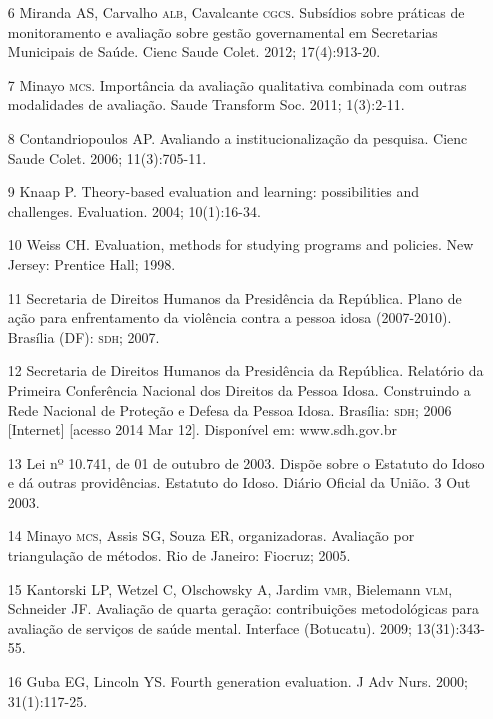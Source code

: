 \documentclass{article}
\begin{document}
\begin{itemize}
\item[6] Miranda AS, Carvalho \textsc{alb}, Cavalcante \textsc{cgcs}. Subsídios sobre práticas de
monitoramento e avaliação sobre gestão governamental em Secretarias Municipais
de Saúde. Cienc Saude Colet. 2012; 17(4):913-20.

\item[7] Minayo \textsc{mcs}. Importância da avaliação qualitativa combinada com outras
modalidades de avaliação. Saude Transform Soc. 2011; 1(3):2-11.

\item[8] Contandriopoulos AP. Avaliando a institucionalização da pesquisa. Cienc
Saude Colet. 2006; 11(3):705-11.

\item[9] Knaap P. Theory-based evaluation and learning: possibilities and
challenges. Evaluation. 2004; 10(1):16-34.

\item[10] Weiss CH. Evaluation, methods for studying programs and policies. New
Jersey: Prentice Hall; 1998.

\item[11] Secretaria de Direitos Humanos da Presidência da República. Plano de
ação para enfrentamento da violência contra a pessoa idosa (2007-2010). Brasília
(DF): \textsc{sdh}; 2007.

\item[12] Secretaria de Direitos Humanos da Presidência da República. Relatório
da Primeira Conferência Nacional dos Direitos da Pessoa Idosa. Construindo a
Rede Nacional de Proteção e Defesa da Pessoa Idosa. Brasília: \textsc{sdh}; 2006
[Internet] [acesso 2014 Mar 12]. Disponível em: www.sdh.gov.br

\item[13] Lei nº 10.741, de 01 de outubro de 2003. Dispõe sobre o Estatuto do
Idoso e dá outras providências. Estatuto do Idoso. Diário Oficial da União. 3
Out 2003.

\item[14] Minayo \textsc{mcs}, Assis SG, Souza ER, organizadoras. Avaliação por
triangulação de métodos. Rio de Janeiro: Fiocruz; 2005.

\item[15] Kantorski LP, Wetzel C, Olschowsky A, Jardim \textsc{vmr}, Bielemann \textsc{vlm},
Schneider JF. Avaliação de quarta geração: contribuições metodológicas para
avaliação de serviços de saúde mental. Interface (Botucatu). 2009;
13(31):343-55.

\item[16] Guba EG, Lincoln YS. Fourth generation evaluation. J Adv Nurs. 2000;
31(1):117-25.


\end{itemize}
\end{document}
